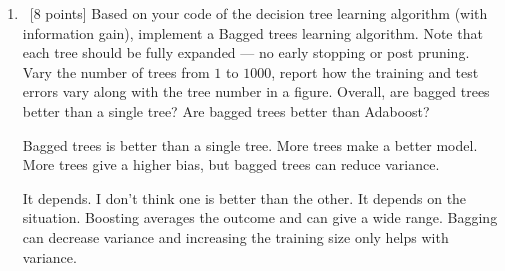 \documentclass[12pt, fullpage,letterpaper]{article}
\begin{document}
\begin{enumerate}
\begin{enumerate}
	\item~[8 points] Based on your code of the decision tree learning algorithm (with information gain), implement a Bagged trees learning algorithm. Note that each tree should be fully expanded --- no early stopping or post pruning. Vary the number of trees from $1$ to $1000$, report how the training and test errors vary along with the tree number in a figure. Overall, are bagged trees better than a single tree? Are bagged trees better than Adaboost? \newline

Bagged trees is better than a single tree. More trees make a better model. More trees give a higher bias, but bagged trees can reduce variance. \newline

It depends. I don't think one is better than the other. It depends on the situation. Boosting averages the outcome and can give a wide range. Bagging can decrease variance and increasing the training size only helps with variance. \newline




\end{enumerate}
\end{enumerate}
\end{document}
